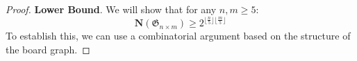 \documentclass[conference]{IEEEtran}
\begin{document}
\vspace{0.6em}
\begin{proof}
    \textbf{Lower Bound}. We will show that for any $n, m \ge 5$:
    $$
        \mathbf{N}(\mathfrak{G}_{n \times m}) \ge 2^{\lfloor{\frac{n}{5}}\rfloor \lfloor{\frac{m}{5}}\rfloor}
    $$
    To establish this, we can use a combinatorial argument based on the structure of the board graph.
\end{proof}
\end{document}
